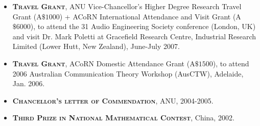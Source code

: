 \documentclass[10pt]{article}
\begin{document}
\begin{itemize}
\item \textsc{\textbf{Travel Grant}}, ANU Vice-Chancellor's Higher Degree Research Travel Grant (A$\$1000$)
+ ACoRN International Attendance and Visit Grant (A$\$6000$), to attend the 31 Audio Engineering Society conference (London, UK) and visit Dr.
Mark Poletti at Gracefield Research Centre, Industrial Research Limited (Lower Hutt, New Zealand), June-July 2007.

\item \textsc{\textbf{Travel Grant}}, ACoRN Domestic Attendance Grant (A$\$1500$), to attend 2006 Australian Communication Theory Workshop
(AusCTW), Adelaide, Jan. 2006.

\item \textsc{\textbf{Chancellor's letter of Commendation}}, ANU, 2004-2005.

\item \textsc{\textbf{Third Prize in National Mathematical Contest}}, China, 2002.

\end{itemize}

\end{document}
